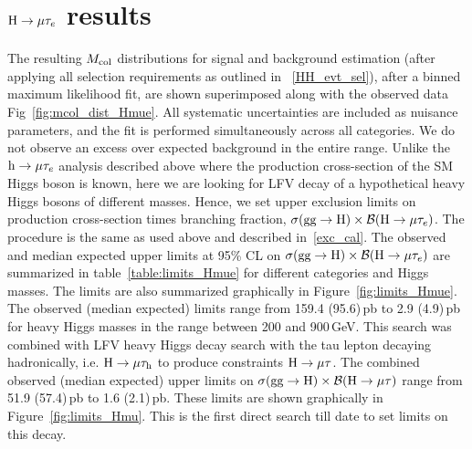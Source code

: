 \section{$\text{H} \to \mu \tau_{e}$ results}
The resulting $M_{\text{col}}$ distributions for signal and background estimation (after applying all selection requirements as outlined in ~\ref{HH_evt_sel}), after a binned maximum likelihood fit, are shown superimposed along with the observed data Fig~\ref{fig:mcol_dist_Hmue}. All systematic uncertainties are included as nuisance parameters, and the fit is performed simultaneously across all categories. We do not observe an excess over expected background in the entire range. Unlike the $\text{h} \to \mu \tau_{e}$ analysis described above where the production cross-section of the SM Higgs boson is known, here we are looking for LFV decay of a hypothetical heavy Higgs bosons of different masses. Hence, we set upper exclusion limits on production cross-section times branching fraction, $\sigma(\textrm{gg}\rightarrow \text{H})\times\mathcal{B}(\text{H} \to \mu \tau_{e})$. The procedure is the same as used above and described in~\ref{exc_cal}. The observed and median expected upper limits at 95\% CL on $\sigma(\textrm{gg}\rightarrow \text{H})\times\mathcal{B}(\text{H} \to \mu \tau_{e})$ are summarized in table~\ref{table:limits_Hmue} for different categories and Higgs masses. The limits are also summarized graphically in Figure~\ref{fig:limits_Hmue}. The observed (median expected) limits range from 159.4 (95.6)\,pb to 2.9 (4.9)\,pb for heavy Higgs masses in the range between 200 and 900\,GeV. This search was combined with LFV heavy Higgs decay search with the tau lepton decaying hadronically, i.e. $\text{H} \to \mu \tau_{\text{h}}$ to produce constraints $\text{H} \to \mu \tau$. The combined observed (median expected) upper limits on $\sigma(\textrm{gg}\rightarrow \text{H})\times\mathcal{B}(\text{H} \to \mu \tau)$ range from 51.9 (57.4)\,pb to 1.6 (2.1)\,pb. These limits are shown graphically in Figure~\ref{fig:limits_Hmu}. This is the first direct search till date to set limits on this decay.      

